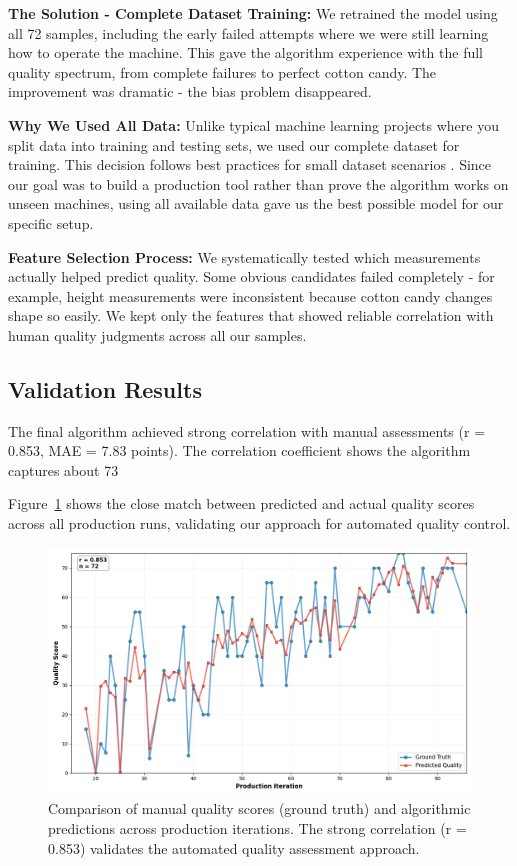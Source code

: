 \textbf{The Solution - Complete Dataset Training:} We retrained the model using all 72 samples, including the early failed attempts where we were still learning how to operate the machine. This gave the algorithm experience with the full quality spectrum, from complete failures to perfect cotton candy. The improvement was dramatic - the bias problem disappeared.

\textbf{Why We Used All Data:} Unlike typical machine learning projects where you split data into training and testing sets, we used our complete dataset for training. This decision follows best practices for small dataset scenarios \cite{Zaki2020}. Since our goal was to build a production tool rather than prove the algorithm works on unseen machines, using all available data gave us the best possible model for our specific setup.

\textbf{Feature Selection Process:} We systematically tested which measurements actually helped predict quality. Some obvious candidates failed completely - for example, height measurements were inconsistent because cotton candy changes shape so easily. We kept only the features that showed reliable correlation with human quality judgments across all our samples.

\subsection{Validation Results}

The final algorithm achieved strong correlation with manual assessments (r = 0.853, MAE = 7.83 points). The correlation coefficient shows the algorithm captures about 73%

Figure~\ref{fig:quality_comparison} shows the close match between predicted and actual quality scores across all production runs, validating our approach for automated quality control.

\begin{figure}[htbp]
    \centering
    \includegraphics[width=1\textwidth]{figures/ground_truth_vs_score3_iterations.png}
    \caption{Comparison of manual quality scores (ground truth) and algorithmic predictions across production iterations. The strong correlation (r = 0.853) validates the automated quality assessment approach.}
    \label{fig:quality_comparison}
\end{figure}

